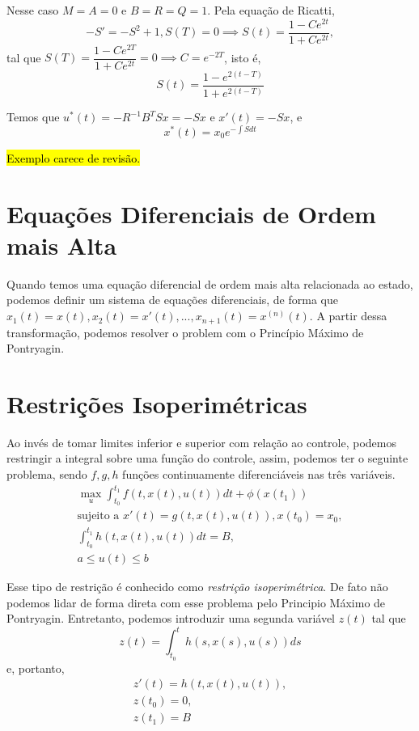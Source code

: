 Nesse caso $M = A = 0$ e $B = R = Q = 1$. Pela equação de Ricatti, 
$$
-S' = - S^2 + 1, S(T) = 0 \implies S(t) = \frac{1 - Ce^{2t}}{1 + Ce^{2t}},
$$
tal que $S(T) = \dfrac{1 - Ce^{2T}}{1 + Ce^{2t}} = 0 \implies C =
e^{-2T}$, isto é, 
$$
S(t) = \frac{1 - e^{2(t-T)}}{1 + e^{2(t-T)}}
$$

Temos que $u^*(t) = - R^{-1}B^TSx = -Sx$ e $x'(t) = -Sx$, e 
$$x^*(t) = x_0e^{-\int S dt}$$

\hl{Exemplo carece de revis\~ao.}

\section{Equações Diferenciais de Ordem mais Alta}

Quando temos uma equação diferencial de ordem mais alta relacionada ao estado,
podemos definir um sistema de equações diferenciais, de forma que $x_1(t) = x(t), x_2(t) = x'(t), ...,
x_{n+1}(t) = x^{(n)}(t)$. A partir dessa transformação, podemos resolver o
problem com o Princípio Máximo de Pontryagin. 

\section{Restrições Isoperimétricas}

Ao invés de tomar limites inferior e superior com relação ao controle, podemos
restringir a integral sobre uma função do controle, assim, podemos ter o
seguinte problema, sendo $f, g, h$ funções continuamente diferenciáveis nas
três variáveis. 
\begin{gather*}
    \max_u \int_{t_0}^{t_1} f(t, x(t), u(t)) dt + \phi(x(t_1)) \\ 
    \text{sujeito a  }x'(t) = g(t, x(t), u(t)), x(t_0) = x_0, \\
    \int_{t_0}^{t_1} h(t, x(t), u(t)) dt = B, \\
    a \le u(t) \le b
\end{gather*}

Esse tipo de restrição é conhecido como \textit{restrição isoperimétrica}. De
fato não podemos lidar de forma direta com esse problema pelo Principio Máximo
de Pontryagin. Entretanto, podemos introduzir uma segunda variável $z(t)$ tal
que 
$$
z(t) = \int_{t_0}^t h(s,x(s),u(s))ds
$$
e, portanto, 
\begin{gather*}
    z'(t) = h(t,x(t),u(t)), \\
    z(t_0) = 0, \\
    z(t_1) = B
\end{gather*}

